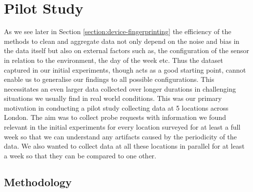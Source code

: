 \section{Pilot Study}

As we see later in Section \ref{section:device-fingerprinting} the efficiency of the methods to clean and aggregate data not only depend on the noise and bias in the data itself but also on external factors such as, the configuration of the sensor in relation to the environment, the day of the week etc.
Thus the dataset captured in our initial experiments, though acts as a good starting point, cannot enable us to generalise our findings to all possible configurations.
This necessitates an even larger data collected over longer durations in challenging situations we usually find in real world conditions.
This was our primary motivation in conducting a pilot study collecting data at 5 locations across London.
The aim was to collect probe requests with information we found relevant in the initial experiments for every location surveyed for at least a full week so that we can understand any artifacts caused by the periodicity of the data.
We also wanted to collect data at all these locations in parallel for at least a week so that they can be compared to one other. 

\subsection{Methodology}

